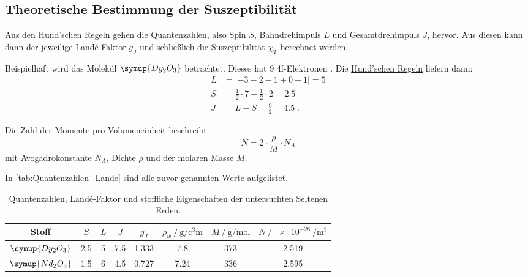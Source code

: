 \subsection{Theoretische Bestimmung der Suszeptibilität}
\label{sec:auswertung:chi_T}

Aus den \hyperref[Hundsche_Regeln]{Hund'schen Regeln} gehen die Quantenzahlen,
also Spin $S$, Bahndrehimpuls $L$ und Gesamtdrehimpuls $J$,
hervor.
Aus diesen kann dann der jeweilige \hyperref[eqn:Lande_Faktor]{Landé-Faktor} $g_J$
und schließlich die Suszeptibilität $\chi_T$ berechnet werden.

Beispielhaft wird das Molekül $\symup{Dy_2O_3}$ betrachtet.
Dieses hat 9 4f-Elektronen \cite{versuchsanleitung}.
Die \hyperref[Hundsche_Regeln]{Hund'schen Regeln} liefern dann:
\begin{align*}
  L &= \lvert -3 -2 -1 +0 +1 \lvert = 5 \\
  S &= \frac{1}{2} \cdot 7 - \frac{1}{2} \cdot 2 = \num{2.5} \\
  J &= L - S = \frac{9}{2} = \num{4.5} \; .
\end{align*}

Die Zahl der Momente pro Volumeneinheit beschreibt
\begin{equation*}
  N = 2 \cdot \frac{\rho}{M} \cdot N_A
\end{equation*}
mit Avogadrokonstante $N_A$, Dichte $\rho$ und der molaren Masse $M$.

In \autoref{tab:Quantenzahlen_Lande} sind alle zuvor genannten Werte aufgelistet.

\begin{table}[H]
  \centering
  \caption{Quantenzahlen, Landé-Faktor und stoffliche Eigenschaften der untersuchten Seltenen Erden.}
  \label{tab:Quantenzahlen_Lande}
  \begin{tabular}{c S S S S c c S}
  \toprule
  Stoff &
  $S$ &
  $L$ &
  $J$ &
  $g_J$ &
  $\rho_w \mathbin{/} \si{\gram\per\cubic\centi\meter}$ &
  $M \mathbin{/} \si{\gram\per\mol}$ &
  $N \mathbin{/} \SI{e-28}{\per\cubic\meter}$ \\
  \midrule
  $\symup{Dy_2O_3}$ & 2.5 & 5 & 7.5 & 1.333 & \num{7.8}  \cite{versuchsanleitung} & \num{373} \cite{molmasse_Dy_2O_3} & 2.519 \\
  $\symup{Nd_2O_3}$ & 1.5 & 6 & 4.5 & 0.727 & \num{7.24} \cite{versuchsanleitung} & \num{336} \cite{molmasse_Nd_2O_3} & 2.595 \\
  \bottomrule
  \end{tabular}
\end{table}

